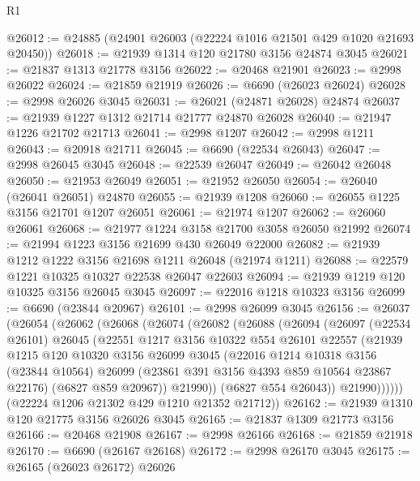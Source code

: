 \begin{lexlean}{R1}
\begin{coremodule}
@26012 := @24885 (@24901 @26003 (@22224 @1016 @21501 @429 @1020 @21693 @20450))
@26018 := @21939 @1314 @120 @21780 @3156 @24874 @3045
@26021 := @21837 @1313 @21778 @3156
@26022 := @20468 @21901
@26023 := @2998 @26022
@26024 := @21859 @21919
@26026 := @6690 (@26023 @26024)
@26028 := @2998 @26026 @3045
@26031 := @26021 (@24871 @26028) @24874
@26037 := @21939 @1227 @1312 @21714 @21777 @24870 @26028
@26040 := @21947 @1226 @21702 @21713
@26041 := @2998 @1207
@26042 := @2998 @1211
@26043 := @20918 @21711
@26045 := @6690 (@22534 @26043)
@26047 := @2998 @26045 @3045
@26048 := @22539 @26047
@26049 := @26042 @26048
@26050 := @21953 @26049
@26051 := @21952 @26050
@26054 := @26040 (@26041 @26051) @24870
@26055 := @21939 @1208
@26060 := @26055 @1225 @3156 @21701 @1207 @26051
@26061 := @21974 @1207
@26062 := @26060 @26061
@26068 := @21977 @1224 @3158 @21700 @3058 @26050 @21992
@26074 := @21994 @1223 @3156 @21699 @430 @26049 @22000
@26082 := @21939 @1212 @1222 @3156 @21698 @1211 @26048 (@21974 @1211)
@26088 := @22579 @1221 @10325 @10327 @22538 @26047 @22603
@26094 := @21939 @1219 @120 @10325 @3156 @26045 @3045
@26097 := @22016 @1218 @10323 @3156
@26099 := @6690 (@23844 @20967)
@26101 := @2998 @26099 @3045
@26156 := @26037
    (@26054
      (@26062
        (@26068
          (@26074
            (@26082
              (@26088
                (@26094
                  (@26097
                    (@22534 @26101)
                    @26045
                    (@22551
                      @1217
                      @3156
                      @10322
                      @554
                      @26101
                      @22557
                      (@21939
                        @1215
                        @120
                        @10320
                        @3156
                        @26099
                        @3045
                        (@22016
                          @1214
                          @10318
                          @3156
                          (@23844 @10564)
                          @26099
                          (@23861 @391 @3156 @4393 @859 @10564 @23867 @22176)
                          (@6827 @859 @20967))
                        @21990))
                    (@6827 @554 @26043))
                  @21990))))))
      (@22224 @1206 @21302 @429 @1210 @21352 @21712))
@26162 := @21939 @1310 @120 @21775 @3156 @26026 @3045
@26165 := @21837 @1309 @21773 @3156
@26166 := @20468 @21908
@26167 := @2998 @26166
@26168 := @21859 @21918
@26170 := @6690 (@26167 @26168)
@26172 := @2998 @26170 @3045
@26175 := @26165 (@26023 @26172) @26026

\end{coremodule}
\end{lexlean}

